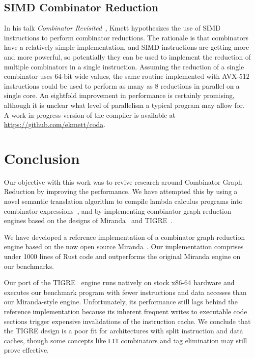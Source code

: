\documentclass[conference]{IEEEtran}
\begin{document}
\subsection{SIMD Combinator Reduction}
In his talk \emph{Combinator Revisited}~\cite{kmett_combinators_2018}, Kmett hypothesizes the use of SIMD instructions to perform combinator reductions.
The rationale is that combinators have a relatively simple implementation, and SIMD instructions are getting more and more powerful, so potentially they can be used to implement the reduction of multiple combinators in a single instruction.
Assuming the reduction of a single combinator uses 64-bit wide values, the same routine implemented with AVX-512 instructions could be used to perform as many as 8 reductions in parallel on a single core.
An eightfold improvement in performance is certainly promising, although it is unclear what level of parallelism a typical program may allow for.
A work-in-progress version of the compiler is available at \url{https://github.com/ekmett/coda}.

\section{Conclusion}
Our objective with this work was to revive research around Combinator Graph Reduction by improving the performance.
We have attempted this by using a novel semantic translation algorithm to compile lambda calculus programs into combinator expressions~\cite{kiselyov_lambda_2018}, and by implementing combinator graph reduction engines based on the designs of Miranda~\cite{turner_new_1979} and TIGRE~\cite{koopman_fresh_1989}.

We have developed a reference implementation of a combinator graph reduction engine based on the now open source Miranda~\cite{turner_new_1979}.
Our implementation comprises under 1000 lines of Rust code and outperforms the original Miranda engine on our benchmarks.

Our port of the TIGRE~\cite{koopman_fresh_1989} engine runs natively on stock x86-64 hardware and executes our benchmark program with fewer instructions and data accesses than our Miranda-style engine.
Unfortunately, its performance still lags behind the reference implementation because its inherent frequent writes to executable code sections trigger expensive invalidations of the instruction cache.
We conclude that the TIGRE design is a poor fit for architectures with split instruction and data caches, though some concepts like \texttt{LIT} combinators and tag elimination may still prove effective.
\end{document}
